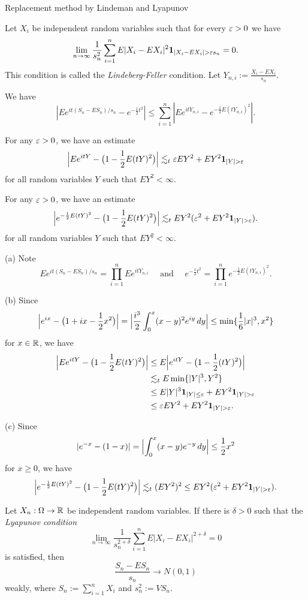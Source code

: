 \documentclass{../note}
\begin{document}
\begin{prb}
Replacement method by Lindeman and Lyapunov
\end{prb}

\begin{prb}
Let $X_i$ be independent random variables such that for every $\varepsilon>0$ we have
\[\lim_{n\to\infty}\frac1{s_n^2}\sum_{i=1}^nE|X_i-EX_i|^2\1_{|X_i-EX_i|>\e s_n}=0.\]
This condition is called the \emph{Lindeberg-Feller} condition.
Let $Y_{n,i}:=\frac{X_i-EX_i}{s_n}$.
\begin{parts}
\item We have
\[|Ee^{it(S_n-ES_n)/s_n}-e^{-\frac12t^2}|\le\sum_{i=1}^n|Ee^{itY_{n,i}}-e^{-\frac12E(tY_{n,i})^2}|.\]
\item For any $\varepsilon>0$, we have an estimate
\[\Bigl|Ee^{itY}-\bigl(1-\frac12E(tY)^2\bigr)\Bigr|\lesssim_t\e EY^2+EY^2\1_{|Y|>\e}\]
for all random variables $Y$ such that $EY^2<\infty$.
\item For any $\varepsilon>0$, we have an estimate
\[\Bigl|e^{-\frac12E(tY)^2}-\bigl(1-\frac12E(tY)^2\bigr)\Bigr|
\lesssim_tEY^2(\e^2+EY^2\1_{|Y|>\e}).\]
for all random variables $Y$ such that $EY^2<\infty$.
\item
\end{parts}
\end{prb}
\begin{pf}
(a)
Note
\[Ee^{it(S_n-ES_n)/s_n}=\prod_{i=1}^nEe^{itY_{n,i}}\quad\text{ and }\quad e^{-\frac12t^2}=\prod_{i=1}^ne^{-\frac12E(tY_{n,i})^2}.\]

(b)
Since
\[\Bigl|e^{ix}-\bigl(1+ix-\frac12x^2\bigr)\Bigr|=\Bigl|\frac{i^3}2\int_0^x(x-y)^2e^{iy}\,dy\Bigr|\le\min\{\frac16|x|^3,x^2\}\]
for $x\in\mathbb{R}$, we have
\begin{align*}
\Bigl|Ee^{itY}-\bigl(1-\frac12E(tY)^2\bigr)\Bigr|
&\le E\Bigl|e^{itY}-\bigl(1-\frac12(tY)^2\bigr)\Bigr|\\
&\lesssim_t E\min\{|Y|^3,Y^2\}\\
&\le E|Y|^3\1_{|Y|\le\e}+EY^2\1_{|Y|>\e}\\
&\le\e EY^2+EY^2\1_{|Y|>\e}.
\end{align*}

(c)
Since
\[|e^{-x}-(1-x)|=\Bigl|\int_0^x(x-y)e^{-y}\,dy\Bigr|\le\frac12x^2\]
for $x\ge0$, we have
\[\Bigl|e^{-\frac12E(tY)^2}-\bigl(1-\frac12E(tY)^2\bigr)\Bigr|
\lesssim_t(EY^2)^2\le EY^2(\e^2+EY^2\1_{|Y|>\e}).\]
\end{pf}

\begin{prb}
Let $X_n:\Omega\to\mathbb{R}$ be independent random variables.
If there is $\delta>0$ such that the \emph{Lyapunov condition}
\[\lim_{n\to\infty}\frac1{s_n^{2+\delta}}\sum_{i=1}^nE|X_i-EX_i|^{2+\delta}=0\]
is satisfied, then
\[\frac{S_n-ES_n}{s_n}\to N(0,1)\]
weakly, where $S_n:=\sum_{i=1}^nX_i$ and $s_n^2:=VS_n$.
\end{prb}
\end{document}
